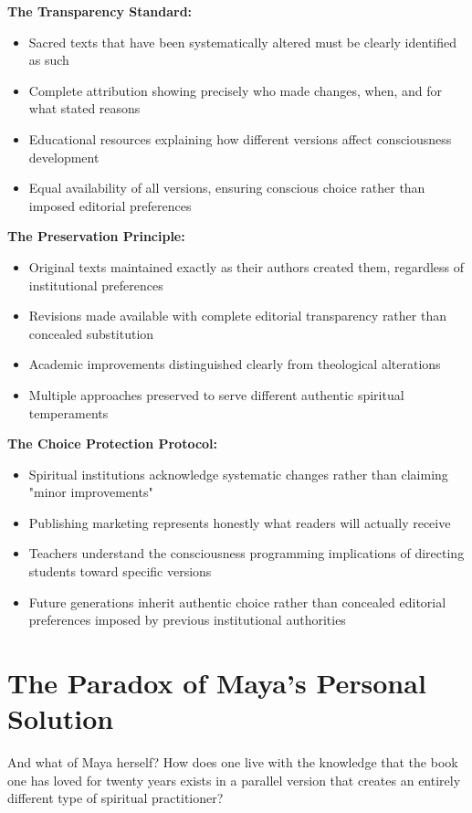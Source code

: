 \documentclass[11pt,twoside]{book}
\begin{document}
\textbf{\textbf{The Transparency Standard:}}
\begin{itemize}
\item Sacred texts that have been systematically altered must be clearly identified as such
\item Complete attribution showing precisely who made changes, when, and for what stated reasons
\item Educational resources explaining how different versions affect consciousness development
\item Equal availability of all versions, ensuring conscious choice rather than imposed editorial preferences
\end{itemize}

\textbf{\textbf{The Preservation Principle:}}
\begin{itemize}
\item Original texts maintained exactly as their authors created them, regardless of institutional preferences
\item Revisions made available with complete editorial transparency rather than concealed substitution
\item Academic improvements distinguished clearly from theological alterations
\item Multiple approaches preserved to serve different authentic spiritual temperaments
\end{itemize}

\textbf{\textbf{The Choice Protection Protocol:}}
\begin{itemize}
\item Spiritual institutions acknowledge systematic changes rather than claiming "minor improvements"
\item Publishing marketing represents honestly what readers will actually receive
\item Teachers understand the consciousness programming implications of directing students toward specific versions
\item Future generations inherit authentic choice rather than concealed editorial preferences imposed by previous institutional authorities
\end{itemize}
\section*{The Paradox of Maya's Personal Solution}
\label{sec:org38a8a7b}

And what of Maya herself? How does one live with the knowledge that the book one has loved for twenty years exists in a parallel version that creates an entirely different type of spiritual practitioner?
\end{document}
